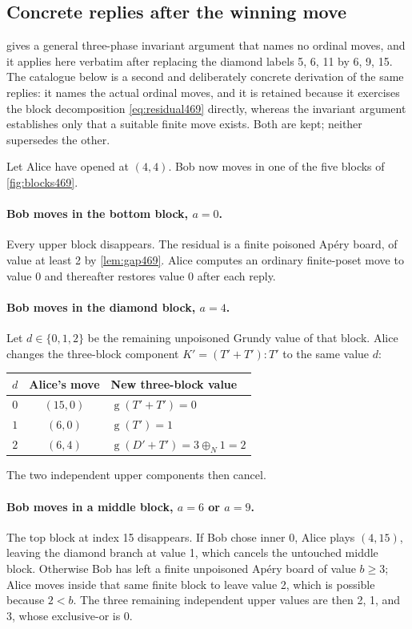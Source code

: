 \documentclass[11pt,letterpaper]{article}
\numberwithin{equation}{section}
\theoremstyle{definition}
\theoremstyle{remark}
\newcommand{\sg}{\operatorname{g}}
\newcommand{\nimadd}{\mathbin{\oplus_{\!N}}}
\begin{document}
\subsection{Concrete replies after the winning move}
\label{sec:replies469}

 gives a general three-phase invariant argument that
names no ordinal moves, and it applies here verbatim after replacing the
diamond labels 5, 6, 11 by 6, 9, 15. The catalogue below is a second and
deliberately concrete derivation of the same replies: it names the actual
ordinal moves, and it is retained because it exercises the block
decomposition \cref{eq:residual469} directly, whereas the invariant
argument establishes only that a suitable finite move exists. Both are
kept; neither supersedes the other.

Let Alice have opened at $(4,4)$. Bob now moves in one of the five blocks
of \cref{fig:blocks469}.

\paragraph{Bob moves in the bottom block, $a=0$.}
Every upper block disappears. The residual is a finite poisoned Ap\'ery
board, of value at least 2 by \cref{lem:gap469}. Alice computes an
ordinary finite-poset move to value 0 and thereafter restores value 0
after each reply.

\paragraph{Bob moves in the diamond block, $a=4$.}
Let $d\in\{0,1,2\}$ be the remaining unpoisoned Grundy value of that
block. Alice changes the three-block component $K'=(T'+T'):T'$ to the
same value $d$:
\begin{center}
\begin{tabular}{ccl}
\toprule
$d$ & Alice's move & New three-block value\\
\midrule
$0$ & $(15,0)$ & $\sg(T'+T')=0$\\
$1$ & $(6,0)$ & $\sg(T')=1$\\
$2$ & $(6,4)$ & $\sg(D'+T')=3\nimadd1=2$\\
\bottomrule
\end{tabular}
\end{center}
The two independent upper components then cancel.

\paragraph{Bob moves in a middle block, $a=6$ or $a=9$.}
The top block at index 15 disappears. If Bob chose inner 0, Alice plays
$(4,15)$, leaving the diamond branch at value 1, which cancels the
untouched middle block. Otherwise Bob has left a finite unpoisoned
Ap\'ery board of value $b\geq3$; Alice moves inside that same finite
block to leave value 2, which is possible because $2<b$. The three
remaining independent upper values are then 2, 1, and 3, whose
exclusive-or is 0.
\end{document}
